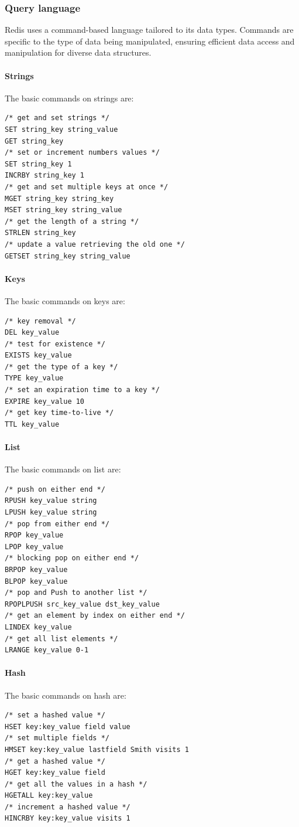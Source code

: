 \subsubsection{Query language}
Redis uses a command-based language tailored to its data types. 
Commands are specific to the type of data being manipulated, ensuring efficient data access and manipulation for diverse data structures.

\paragraph*{Strings}
The basic commands on strings are: 
\begin{lstlisting}[style=Redis]
/* get and set strings */
SET string_key string_value
GET string_key 
/* set or increment numbers values */
SET string_key 1
INCRBY string_key 1
/* get and set multiple keys at once */
MGET string_key string_key
MSET string_key string_value
/* get the length of a string */
STRLEN string_key 
/* update a value retrieving the old one */
GETSET string_key string_value
\end{lstlisting}

\paragraph*{Keys}
The basic commands on keys are: 
\begin{lstlisting}[style=Redis]
/* key removal */
DEL key_value
/* test for existence */
EXISTS key_value
/* get the type of a key */
TYPE key_value
/* set an expiration time to a key */
EXPIRE key_value 10 
/* get key time-to-live */
TTL key_value
\end{lstlisting}

\paragraph*{List}
The basic commands on list are: 
\begin{lstlisting}[style=Redis]
/* push on either end */
RPUSH key_value string
LPUSH key_value string
/* pop from either end */
RPOP key_value
LPOP key_value
/* blocking pop on either end */
BRPOP key_value
BLPOP key_value
/* pop and Push to another list */
RPOPLPUSH src_key_value dst_key_value
/* get an element by index on either end */
LINDEX key_value
/* get all list elements */
LRANGE key_value 0-1
\end{lstlisting}

\paragraph*{Hash}
The basic commands on hash are: 
\begin{lstlisting}[style=Redis]
/* set a hashed value */
HSET key:key_value field value 
/* set multiple fields */
HMSET key:key_value lastfield Smith visits 1
/* get a hashed value */
HGET key:key_value field
/* get all the values in a hash */
HGETALL key:key_value
/* increment a hashed value */
HINCRBY key:key_value visits 1
\end{lstlisting}


